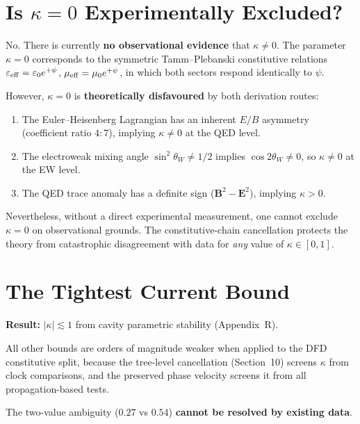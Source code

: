 \documentclass[11pt,a4paper]{article}
\theoremstyle{definition}
\begin{document}
\section{Is $\kappa = 0$ Experimentally Excluded?}
\label{sec:kappa-zero}

No.  There is currently \textbf{no observational evidence} that
$\kappa \neq 0$.  The parameter $\kappa = 0$ corresponds to the
symmetric Tamm--Plebanski constitutive relations
$\varepsilon_{\rm eff} = \varepsilon_0 e^{+\psi}$,
$\mu_{\rm eff} = \mu_0 e^{+\psi}$, in which both sectors respond
identically to $\psi$.

However, $\kappa = 0$ is \textbf{theoretically disfavoured} by
both derivation routes:
\begin{enumerate}
\item The Euler--Heisenberg Lagrangian has an inherent $E/B$
  asymmetry (coefficient ratio $4:7$), implying $\kappa \neq 0$
  at the QED level.
\item The electroweak mixing angle $\sin^2\theta_W \neq 1/2$
  implies $\cos 2\theta_W \neq 0$, so $\kappa \neq 0$ at
  the EW level.
\item The QED trace anomaly has a definite sign
  ($\mathbf{B}^2 - \mathbf{E}^2$), implying $\kappa > 0$.
\end{enumerate}
Nevertheless, without a direct experimental measurement, one
cannot exclude $\kappa = 0$ on observational grounds.  The
constitutive-chain cancellation protects the theory from
catastrophic disagreement with data for \emph{any} value of
$\kappa \in [0, 1]$.


\section{The Tightest Current Bound}
\label{sec:tightest}

\begin{tcolorbox}[colback=blue!5!white, colframe=blue!50!black,
  title=Tightest Observational Bound on $\kappa$]
\textbf{Result:} $|\kappa| \lesssim 1$ from cavity parametric
stability (Appendix~R).

All other bounds are orders of magnitude weaker when applied
to the DFD constitutive split, because the tree-level cancellation
(Section~10) screens $\kappa$ from clock comparisons, and the
preserved phase velocity screens it from all propagation-based
tests.

The two-value ambiguity ($0.27$ vs $0.54$) \textbf{cannot be
resolved by existing data}.
\end{tcolorbox}
\end{document}
